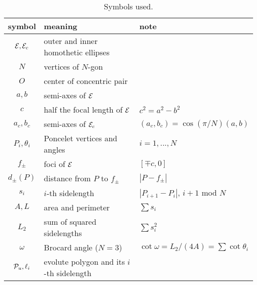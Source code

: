 \begin{table}[H]
\small
\begin{tabular}{|c|l|l|}
\hline
symbol & meaning & note \\
\hline
$\mathcal{E},\mathcal{E}_c$ & outer and inner homothetic ellipses & \\
$N$ & vertices of $N$-gon & \\
$O$ & center of concentric pair & \\
$a,b$ & semi-axes of $\mathcal{E}$ & \\
$c$ & half the focal length of $\mathcal{E}$ & $c^2=a^2-b^2$ \\
$a_c,b_c$ & semi-axes of $\mathcal{E}_c$ & $(a_c,b_c) = \cos(\pi/N) (a,b)$ \\
$P_i,\theta_i$ & Poncelet vertices and angles & $i=1,...,N$\\
$f_\pm$ & foci of $\mathcal{E}$ & $[\mp c,0]$ \\
$d_\pm(P)$ & distance from $P$ to $f_\pm$ & $|P-f_\pm|$ \\
$s_i$ & $i$-th sidelength & $|P_{i+1}-P_i|$, $i+1$ mod $N$\\
$A,L$ & area and perimeter & $\sum{s_i}$ \\
$L_{2}$ & sum of squared sidelengths & $\sum{s_i^2}$ \\
$\omega$ & Brocard angle ($N=3$) & $\cot\omega=L_{2}/(4A)=\sum\cot{\theta_i}$ \\
$\mathcal{P}_u,\ell_i$ & evolute polygon and its $i$-th sidelength & \\
\hline
\end{tabular}
\caption{Symbols used.}
\label{tab:symbols}
\end{table}
